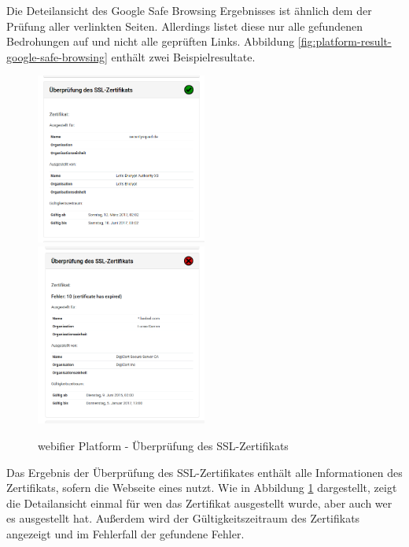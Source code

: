 Die Deteilansicht des Google Safe Browsing Ergebnisses ist ähnlich dem der Prüfung aller verlinkten Seiten. Allerdings listet diese nur alle gefundenen Bedrohungen auf und nicht alle geprüften Links. Abbildung \ref{fig:platform-result-google-safe-browsing} enthält zwei Beispielresultate.

\begin{figure}[H]
\centerline{%
\includegraphics[width=0.5\textwidth]{images/platform/certificatechecker-clean}%
\includegraphics[width=0.5\textwidth]{images/platform/certificatechecker-malicious}%
}%
\caption{webifier Platform - Überprüfung des SSL-Zertifikats}
\label{fig:platform-result-certificatechecker}
\end{figure}

Das Ergebnis der Überprüfung des SSL-Zertifikates enthält alle Informationen des Zertifikats, sofern die Webseite eines nutzt. Wie in Abbildung \ref{fig:platform-result-certificatechecker} dargestellt, zeigt die Detailansicht einmal für wen das Zertifikat ausgestellt wurde, aber auch wer es ausgestellt hat. Außerdem wird der Gültigkeitszeitraum des Zertifikats angezeigt und im Fehlerfall der gefundene Fehler.

